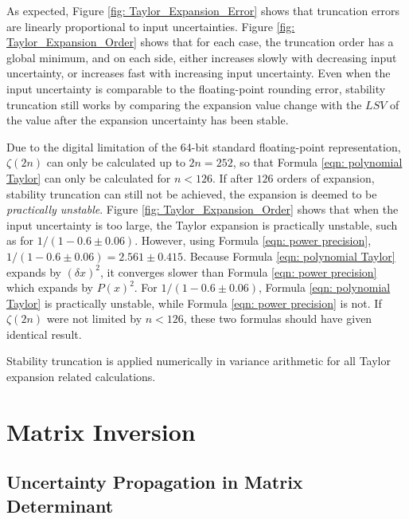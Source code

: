 \documentclass[twoside]{article}
\numberwithin{equation}{section}
\begin{document}
As expected, Figure \ref{fig: Taylor_Expansion_Error} shows that truncation errors are linearly proportional to input uncertainties.
Figure \ref{fig: Taylor_Expansion_Order} shows that for each case, the truncation order has a global minimum, and on each side, either increases slowly with decreasing input uncertainty, or increases fast with increasing input uncertainty.
Even when the input uncertainty is comparable to the floating-point rounding error, stability truncation still works by comparing the expansion value change with the $LSV$ of the value after the expansion uncertainty has been stable.

Due to the digital limitation of the 64-bit standard floating-point representation, $\zeta(2n)$ can only be calculated up to $2n = 252$, so that Formula \eqref{eqn: polynomial Taylor} can only be calculated for $n < 126$.
If after $126$ orders of expansion, stability truncation can still not be achieved, the expansion is deemed to be \emph{practically unstable}.
Figure \ref{fig: Taylor_Expansion_Order} shows that when the input uncertainty is too large, the Taylor expansion is practically unstable, such as for $1/(1 - 0.6 \pm 0.06)$.
However, using Formula \eqref{eqn: power precision}, $1/(1 - 0.6 \pm 0.06) = 2.561 \pm 0.415$.
Because Formula \eqref{eqn: polynomial Taylor} expands by $(\delta x)^2$, it converges slower than Formula \eqref{eqn: power precision} which expands by $P(x)^2$.
For $1/(1 - 0.6 \pm 0.06)$,  Formula \eqref{eqn: polynomial Taylor} is practically unstable, while  Formula \eqref{eqn: power precision} is not.
If $\zeta(2n)$ were not limited by $n < 126$, these two formulas should have given identical result.

Stability truncation is applied numerically in variance arithmetic for all Taylor expansion related calculations. 




\clearpage
\section{Matrix Inversion}
\label{sec: matrix}


\subsection{Uncertainty Propagation in Matrix Determinant}

\iffalse
\end{document}
